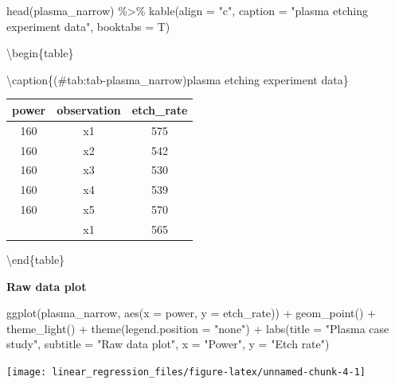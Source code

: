 \documentclass[
]{book}
\newenvironment{Shaded}{\begin{snugshade}}{\end{snugshade}}
\newcommand{\AttributeTok}[1]{\textcolor[rgb]{0.77,0.63,0.00}{#1}}
\newcommand{\FunctionTok}[1]{\textcolor[rgb]{0.00,0.00,0.00}{#1}}
\newcommand{\NormalTok}[1]{#1}
\newcommand{\SpecialCharTok}[1]{\textcolor[rgb]{0.00,0.00,0.00}{#1}}
\newcommand{\StringTok}[1]{\textcolor[rgb]{0.31,0.60,0.02}{#1}}
\begin{document}
\begin{Shaded}
\begin{Highlighting}[]
\FunctionTok{head}\NormalTok{(plasma\_narrow) }\SpecialCharTok{\%\textgreater{}\%} 
  \FunctionTok{kable}\NormalTok{(}\AttributeTok{align =} \StringTok{"c"}\NormalTok{, }
        \AttributeTok{caption =} \StringTok{"plasma etching experiment data"}\NormalTok{, }
        \AttributeTok{booktabs =}\NormalTok{ T)}
\end{Highlighting}
\end{Shaded}

\textbackslash begin\{table\}

\textbackslash caption\{(\#tab:tab-plasma\_narrow)plasma etching experiment data\}
\centering

\begin{tabular}[t]{ccc}
\toprule
power & observation & etch\_rate\\
\midrule
160 & x1 & 575\\
160 & x2 & 542\\
160 & x3 & 530\\
160 & x4 & 539\\
160 & x5 & 570\\
\addlinespace
180 & x1 & 565\\
\bottomrule
\end{tabular}

\textbackslash end\{table\}

\textbf{Raw data plot}

\begin{Shaded}
\begin{Highlighting}[]
\FunctionTok{ggplot}\NormalTok{(plasma\_narrow, }\FunctionTok{aes}\NormalTok{(}\AttributeTok{x =}\NormalTok{ power, }\AttributeTok{y =}\NormalTok{ etch\_rate)) }\SpecialCharTok{+}
  \FunctionTok{geom\_point}\NormalTok{() }\SpecialCharTok{+}
  \FunctionTok{theme\_light}\NormalTok{() }\SpecialCharTok{+}
  \FunctionTok{theme}\NormalTok{(}\AttributeTok{legend.position =} \StringTok{"none"}\NormalTok{) }\SpecialCharTok{+}
  \FunctionTok{labs}\NormalTok{(}\AttributeTok{title =} \StringTok{"Plasma case study"}\NormalTok{,}
       \AttributeTok{subtitle =} \StringTok{"Raw data plot"}\NormalTok{,}
       \AttributeTok{x =} \StringTok{"Power"}\NormalTok{,}
       \AttributeTok{y =} \StringTok{"Etch rate"}\NormalTok{)}
\end{Highlighting}
\end{Shaded}

\texttt{[image: linear\_regression\_files/figure-latex/unnamed-chunk-4-1]}
\end{document}
